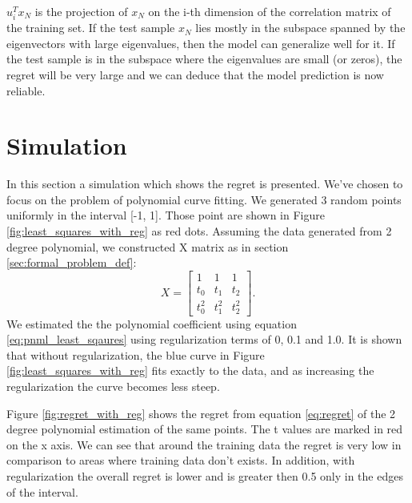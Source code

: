 \documentclass[letterpaper, 10 pt, conference]{ieeeconf}  %
\begin{document}
$u_i^T x_N$ is the projection of $x_N$ on the i-th dimension of the correlation matrix of the training set. If the test sample $x_N$ lies mostly in the subspace spanned by the eigenvectors with large eigenvalues, then the model can generalize well for it. If the test sample is in the subspace where the eigenvalues are small (or zeros), the regret will be very large and we can deduce that the model prediction is now reliable.

\section{Simulation} \label{sec:simulation}
In this section a  simulation which shows the regret is presented.
We've chosen to focus on the problem of polynomial curve fitting.
We generated 3 random points uniformly in the interval [-1, 1]. Those point are shown in Figure \ref{fig:least_squares_with_reg} as red dots. Assuming the data generated from 2 degree polynomial, we constructed X matrix as in section \ref{sec:formal_problem_def}:
\begin{equation}
X = 
\begin{bmatrix}
1 & 1 & 1 \\
t_0 & t_1 & t_2 \\
t_0^2 & t_1^2 & t_2^2 
\end{bmatrix}.
\end{equation}
We estimated the the polynomial coefficient using equation \ref{eq:pnml_least_sqaures} using regularization terms of 0, 0.1 and 1.0. It is shown that without regularization, the blue curve in Figure \ref{fig:least_squares_with_reg} fits exactly to the data, and as increasing the regularization the curve becomes less steep.

Figure \ref{fig:regret_with_reg} shows the regret from equation \ref{eq:regret} of the 2 degree polynomial estimation of the same points. The t values are marked in red on the x axis. We can see that around the training data the regret is very low in comparison to areas where training data don't exists. In addition, with regularization the overall regret is lower and is greater then 0.5 only in the edges of the interval.
\end{document}
